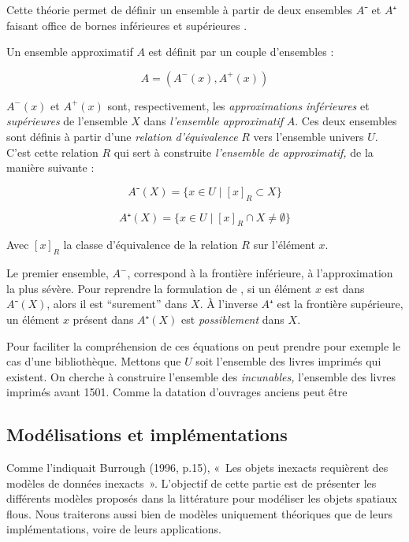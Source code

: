 Cette théorie permet de définir un ensemble à partir de deux ensembles
$A⁻$ et $A⁺$ faisant office de bornes inférieures et supérieures
\autocite{Gacogne1997}.

Un ensemble approximatif $A$ est définit par un couple d'ensembles :

\begin{equation}
  A = (A^-(x),A^+(x))  
\end{equation}

$A^-(x)$ et $A^+(x)$ sont, respectivement, les \emph{approximations}
\emph{inférieures} et \emph{supérieures} de l'ensemble $X$ dans
\emph{l'ensemble approximatif} $A$. Ces deux ensembles sont définis à
partir d'une \emph{relation d'équivalence} $R$ vers l'ensemble univers
$U$. C'est cette relation $R$ qui sert à construite \emph{l'ensemble
  de approximatif,} de la manière suivante :

\begin{equation}
  A⁻(X) = \{ x ∈ U ∣ [x]_R ⊂ X \}
\end{equation}

\begin{equation}
  A⁺(X) = \{ x ∈ U ∣ [x]_R ∩ X ≠ ∅ \}
\end{equation}

Avec $[x]_R$ la classe d'équivalence de la relation $R$ sur l'élément
$x$.

Le premier ensemble, $A^-$, correspond à la frontière inférieure, à
l'approximation la plus sévère. Pour reprendre la formulation de
\textcite{Pawlak1985}, si un élément $x$ est dans $A⁻(X)$, alors il
est \enquote{surement} dans $X$. À l'inverse $A⁺$ est la frontière
supérieure, un élément $x$ présent dans $A⁺(X)$ est
\emph{possiblement} dans $X$.


Pour faciliter la compréhension de ces équations on peut prendre pour
exemple le cas d'une bibliothèque. Mettons que $U$ soit l'ensemble des
livres imprimés qui existent. On cherche à construire l'ensemble des
\emph{incunables,} \ie l'ensemble des livres imprimés avant
1501. Comme la datation d'ouvrages anciens peut être 


\subsection{Modélisations et implémentations}


Comme l’indiquait Burrough (1996, p.15), « Les objets inexacts
requièrent des modèles de données inexacts ». L’objectif de cette
partie est de présenter les différents modèles proposés dans la
littérature pour modéliser les objets spatiaux flous. Nous
traiterons aussi bien de modèles uniquement théoriques que de leurs
implémentations, voire de leurs applications.

